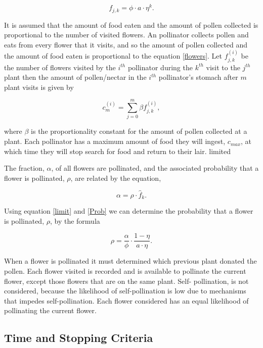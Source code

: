 \begin{equation}\label{flowers}
f_{j,k} = \phi \cdot a \cdot \eta^k.
\end{equation}

It is assumed that the amount of food eaten and the amount of pollen collected is proportional to
the number of visited flowers. An pollinator collects pollen and eats from every flower that it
visits, and so the amount of pollen collected and the amount of food eaten is proportional to the
equation \eqref{flowers}. Let $f^{\left(i\right)}_{j,k}$ be the number of flowers visited by the
$i^{th}$ pollinator during the $k^{th}$ visit to the $j^{th}$ plant then the amount of pollen/nectar
in the $i^{th}$ pollinator's stomach after $m$ plant visits is given by

\begin{equation}
c^{\left(i\right)}_m = \sum_{j=0}^{m} \beta f^{\left(i\right)}_{j,k},
\label{limit}
\end{equation}

where $\beta$ is the proportionality constant for the amount of pollen collected at a plant.
Each pollinator has a maximum amount of food they will ingest, $c_{max}$, at which time they will stop
search for food and return to their lair. %
limited

The fraction, $\alpha$, of all flowers are pollinated, and the associated probability that a
flower is pollinated, $\rho$, are related by the equation,

\begin{equation} \label{Prob}
\alpha = \rho \cdot \hat{f}_k.
\end{equation}

Using equation \eqref{limit} and \eqref{Prob} we can determine the probability that a flower is
pollinated, $\rho$, by the formula

\[
\rho = \frac{\alpha}{\phi} \cdot \frac{1 - \eta}{a \cdot \eta}.
\]

When a flower is pollinated it must determined which previous plant donated the pollen. Each
flower visited is recorded and is available to pollinate the current flower, except those flowers
that are on the same plant. Self- pollination, is not considered, because the likelihood of
self-pollination is low due to mechanisms that impedes self-pollination. Each flower considered
has an equal likelihood of pollinating the current flower.

\subsection{Time and Stopping Criteria}

